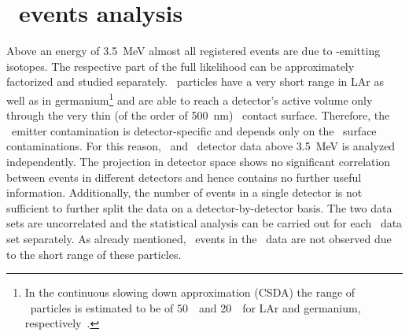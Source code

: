 \section{\texorpdfstring{\a\ events analysis}{alpha events analysis}}%
\label{sec:bkg:raw:ph2:amodel}

Above an energy of 3.5~MeV almost all registered events are due to \a-emitting isotopes.
The respective part of the full likelihood can be approximately factorized and studied
separately. \a\ particles have a very short range in LAr as well as in
germanium\footnote{%
  In the continuous slowing down approximation (CSDA) the range of \a\ particles is
  estimated to be of 50~\mum\ and 20~\mum\ for LAr and germanium,
  respectively~\cite{Berger2017}.
} and are able to reach a detector's active volume only
through the very thin (of the order of 500~nm) \pplus\ contact surface. Therefore, the \a\
emitter contamination is detector-specific and depends only on the \pplus\ surface
contaminations. For this reason, \enrBEGeII\ and \enrCoaxII\ detector data above 3.5~MeV
is analyzed independently. The projection in detector space shows no significant correlation
between events in different detectors and hence contains no further useful information.
Additionally, the number of events in a single detector is not sufficient to further split
the data on a detector-by-detector basis. The two data sets are uncorrelated and the
statistical analysis can be carried out for each \Mone\ data set separately. As already
mentioned, \a\ events in the \Mtwo\ data are not observed due to the short range of these
particles.

